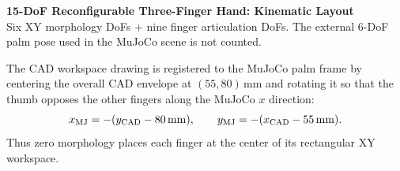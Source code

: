 \documentclass[11pt]{article}
\newcommand{\mm}{\,\mathrm{mm}}
\begin{document}
\begin{center}
{\Large \textbf{15-DoF Reconfigurable Three-Finger Hand: Kinematic Layout}}\\[2mm]
{\small Six XY morphology DoFs + nine finger articulation DoFs. The external 6-DoF palm pose used in the MuJoCo scene is not counted.}
\end{center}

\vspace{1mm}
\noindent
The CAD workspace drawing is registered to the MuJoCo palm frame by centering the overall CAD envelope at
$(55,80)\mm$ and rotating it so that the thumb opposes the other fingers along the MuJoCo $x$ direction:
\[
 x_{\rm MJ}=-(y_{\rm CAD}-80\mm),\qquad
 y_{\rm MJ}=-(x_{\rm CAD}-55\mm).
\]
Thus zero morphology places each finger at the center of its rectangular XY workspace.
\end{document}
